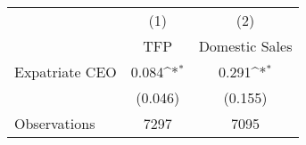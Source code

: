{
\def\sym#1{\ifmmode^{#1}\else\(^{#1}\)\fi}
\begin{tabular}{l*{2}{c}}
\hline\hline
                    &\multicolumn{1}{c}{(1)}&\multicolumn{1}{c}{(2)}\\
                    &\multicolumn{1}{c}{TFP}&\multicolumn{1}{c}{Domestic Sales}\\
\hline
Expatriate CEO      &       0.084\sym{*}  &       0.291\sym{*}  \\
                    &     (0.046)         &     (0.155)         \\
\hline
Observations        &        7297         &        7095         \\
\hline\hline
\end{tabular}
}
